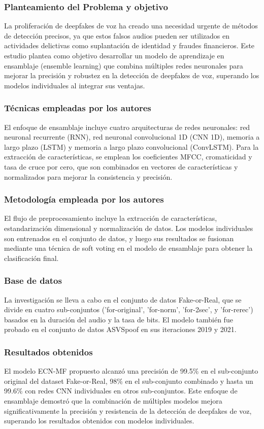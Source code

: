 \subsubsection{Planteamiento del Problema y objetivo }
La proliferación de deepfakes de voz ha creado una necesidad urgente de métodos de detección precisos, ya que estos falsos audios pueden ser utilizados en actividades delictivas como suplantación de identidad y fraudes financieros. Este estudio plantea como objetivo desarrollar un modelo de aprendizaje en ensamblaje (ensemble learning) que combina múltiples redes neuronales para mejorar la precisión y robustez en la detección de deepfakes de voz, superando los modelos individuales al integrar sus ventajas.

\subsubsection{Técnicas empleadas por los autores}
El enfoque de ensamblaje incluye cuatro arquitecturas de redes neuronales: red neuronal recurrente (RNN), red neuronal convolucional 1D (CNN 1D), memoria a largo plazo (LSTM) y memoria a largo plazo convolucional (ConvLSTM). Para la extracción de características, se emplean los coeficientes MFCC, cromaticidad y tasa de cruce por cero, que son combinados en vectores de características y normalizados para mejorar la consistencia y precisión. 

\subsubsection{Metodología empleada por los autores}
El flujo de preprocesamiento incluye la extracción de características, estandarización dimensional y normalización de datos. Los modelos individuales son entrenados en el conjunto de datos, y luego sus resultados se fusionan mediante una técnica de soft voting en el modelo de ensamblaje para obtener la clasificación final.

\subsubsection{Base de datos}
La investigación se lleva a cabo en el conjunto de datos Fake-or-Real, que se divide en cuatro sub-conjuntos ('for-original', 'for-norm', 'for-2sec', y 'for-rerec') basados en la duración del audio y la tasa de bits. El modelo también fue probado en el conjunto de datos ASVSpoof en sus iteraciones 2019 y 2021.

\subsubsection{Resultados obtenidos}
El modelo ECN-MF propuesto alcanzó una precisión de 99.5\% en el sub-conjunto original del dataset Fake-or-Real, 98\% en el sub-conjunto combinado y hasta un 99.6\% con redes CNN individuales en otros sub-conjuntos. Este enfoque de ensamblaje demostró que la combinación de múltiples modelos mejora significativamente la precisión y resistencia de la detección de deepfakes de voz, superando los resultados obtenidos con modelos individuales.

